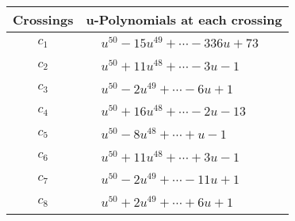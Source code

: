 \documentclass[1p]{elsarticle_modified}
\theoremstyle{definition}
\begin{document}
\begin{tabular}{m{50pt}|m{274pt}}
Crossings & \hspace{64pt}u-Polynomials at each crossing \\
\hline $$\begin{aligned}c_{1}\end{aligned}$$&$\begin{aligned}
&u^{50}-15 u^{49}+\cdots-336 u+73
\end{aligned}$\\
\hline $$\begin{aligned}c_{2}\end{aligned}$$&$\begin{aligned}
&u^{50}+11 u^{48}+\cdots-3 u-1
\end{aligned}$\\
\hline $$\begin{aligned}c_{3}\end{aligned}$$&$\begin{aligned}
&u^{50}-2 u^{49}+\cdots-6 u+1
\end{aligned}$\\
\hline $$\begin{aligned}c_{4}\end{aligned}$$&$\begin{aligned}
&u^{50}+16 u^{48}+\cdots-2 u-13
\end{aligned}$\\
\hline $$\begin{aligned}c_{5}\end{aligned}$$&$\begin{aligned}
&u^{50}-8 u^{48}+\cdots+u-1
\end{aligned}$\\
\hline $$\begin{aligned}c_{6}\end{aligned}$$&$\begin{aligned}
&u^{50}+11 u^{48}+\cdots+3 u-1
\end{aligned}$\\
\hline $$\begin{aligned}c_{7}\end{aligned}$$&$\begin{aligned}
&u^{50}-2 u^{49}+\cdots-11 u+1
\end{aligned}$\\
\hline $$\begin{aligned}c_{8}\end{aligned}$$&$\begin{aligned}
&u^{50}+2 u^{49}+\cdots+6 u+1
\end{aligned}$\\

\end{tabular}
\end{document}
